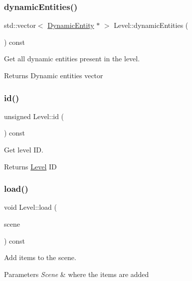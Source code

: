 \subsubsection{\texorpdfstring{dynamic\+Entities()}{dynamicEntities()}}
{\footnotesize\ttfamily std\+::vector$<$ \hyperlink{class_dynamic_entity}{Dynamic\+Entity} $\ast$ $>$ Level\+::dynamic\+Entities (\begin{DoxyParamCaption}{ }\end{DoxyParamCaption}) const}



Get all dynamic entities present in the level. 

\begin{DoxyReturn}{Returns}
Dynamic entities vector 
\end{DoxyReturn}
\mbox{\label{class_level_afa0e14e0f2233497373be981c5ffdfa8}} 
\subsubsection{\texorpdfstring{id()}{id()}}
{\footnotesize\ttfamily unsigned Level\+::id (\begin{DoxyParamCaption}{ }\end{DoxyParamCaption}) const}



Get level ID. 

\begin{DoxyReturn}{Returns}
\hyperlink{class_level}{Level} ID 
\end{DoxyReturn}
\mbox{\label{class_level_a04991c68f0868041b33f376252010aef}} 
\subsubsection{\texorpdfstring{load()}{load()}}
{\footnotesize\ttfamily void Level\+::load (\begin{DoxyParamCaption}\item[{Q\+Graphics\+Scene $\ast$}]{scene }\end{DoxyParamCaption}) const}



Add items to the scene. 


\begin{DoxyParams}{Parameters}
{\em Scene} & where the items are added \\
\hline
\end{DoxyParams}
\mbox{\label{class_level_a55628d95ef5195f50afbb46c91b8ccdf}} 
